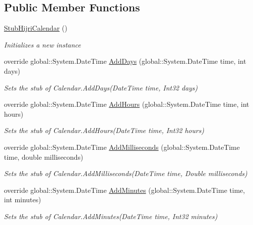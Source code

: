 \subsection*{Public Member Functions}
\begin{DoxyCompactItemize}
\item 
\hyperlink{class_system_1_1_globalization_1_1_fakes_1_1_stub_hijri_calendar_ae557c5a2b926675d26a831ff9583fc9e}{Stub\-Hijri\-Calendar} ()
\begin{DoxyCompactList}\small\item\em Initializes a new instance\end{DoxyCompactList}\item 
override global\-::\-System.\-Date\-Time \hyperlink{class_system_1_1_globalization_1_1_fakes_1_1_stub_hijri_calendar_a3c544d3c4f1f89c151017e1cc4066104}{Add\-Days} (global\-::\-System.\-Date\-Time time, int days)
\begin{DoxyCompactList}\small\item\em Sets the stub of Calendar.\-Add\-Days(\-Date\-Time time, Int32 days)\end{DoxyCompactList}\item 
override global\-::\-System.\-Date\-Time \hyperlink{class_system_1_1_globalization_1_1_fakes_1_1_stub_hijri_calendar_a8d2511cbebaa6102a9e8babb0c6bc621}{Add\-Hours} (global\-::\-System.\-Date\-Time time, int hours)
\begin{DoxyCompactList}\small\item\em Sets the stub of Calendar.\-Add\-Hours(\-Date\-Time time, Int32 hours)\end{DoxyCompactList}\item 
override global\-::\-System.\-Date\-Time \hyperlink{class_system_1_1_globalization_1_1_fakes_1_1_stub_hijri_calendar_ab2fed8c7d854c540cce07fc94e3ae4fa}{Add\-Milliseconds} (global\-::\-System.\-Date\-Time time, double milliseconds)
\begin{DoxyCompactList}\small\item\em Sets the stub of Calendar.\-Add\-Milliseconds(\-Date\-Time time, Double milliseconds)\end{DoxyCompactList}\item 
override global\-::\-System.\-Date\-Time \hyperlink{class_system_1_1_globalization_1_1_fakes_1_1_stub_hijri_calendar_a99bc10b99251f20effe3edc10ddac4e2}{Add\-Minutes} (global\-::\-System.\-Date\-Time time, int minutes)
\begin{DoxyCompactList}\small\item\em Sets the stub of Calendar.\-Add\-Minutes(\-Date\-Time time, Int32 minutes)\end{DoxyCompactList}\item 

\end{DoxyCompactItemize}
